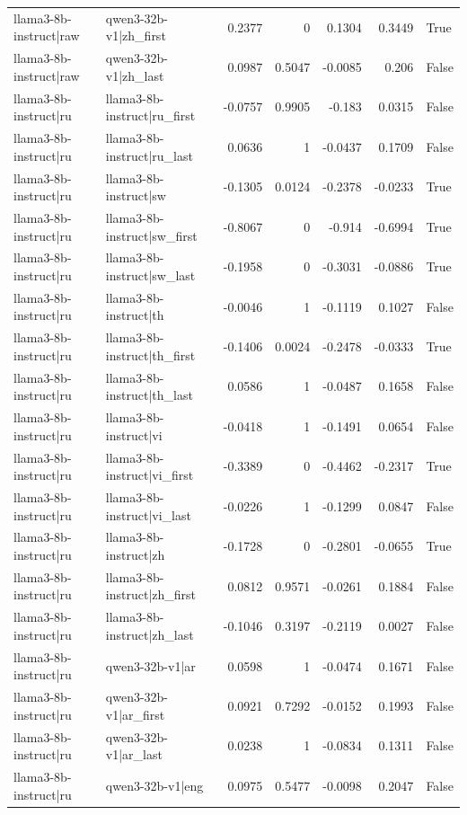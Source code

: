 \begin{table}
\begin{tabular}{l l r r r r l}
llama3-8b-instruct|raw & qwen3-32b-v1|zh_first & 0.2377 & 0 & 0.1304 & 0.3449 & True \\
llama3-8b-instruct|raw & qwen3-32b-v1|zh_last & 0.0987 & 0.5047 & -0.0085 & 0.206 & False \\
llama3-8b-instruct|ru & llama3-8b-instruct|ru_first & -0.0757 & 0.9905 & -0.183 & 0.0315 & False \\
llama3-8b-instruct|ru & llama3-8b-instruct|ru_last & 0.0636 & 1 & -0.0437 & 0.1709 & False \\
llama3-8b-instruct|ru & llama3-8b-instruct|sw & -0.1305 & 0.0124 & -0.2378 & -0.0233 & True \\
llama3-8b-instruct|ru & llama3-8b-instruct|sw_first & -0.8067 & 0 & -0.914 & -0.6994 & True \\
llama3-8b-instruct|ru & llama3-8b-instruct|sw_last & -0.1958 & 0 & -0.3031 & -0.0886 & True \\
llama3-8b-instruct|ru & llama3-8b-instruct|th & -0.0046 & 1 & -0.1119 & 0.1027 & False \\
llama3-8b-instruct|ru & llama3-8b-instruct|th_first & -0.1406 & 0.0024 & -0.2478 & -0.0333 & True \\
llama3-8b-instruct|ru & llama3-8b-instruct|th_last & 0.0586 & 1 & -0.0487 & 0.1658 & False \\
llama3-8b-instruct|ru & llama3-8b-instruct|vi & -0.0418 & 1 & -0.1491 & 0.0654 & False \\
llama3-8b-instruct|ru & llama3-8b-instruct|vi_first & -0.3389 & 0 & -0.4462 & -0.2317 & True \\
llama3-8b-instruct|ru & llama3-8b-instruct|vi_last & -0.0226 & 1 & -0.1299 & 0.0847 & False \\
llama3-8b-instruct|ru & llama3-8b-instruct|zh & -0.1728 & 0 & -0.2801 & -0.0655 & True \\
llama3-8b-instruct|ru & llama3-8b-instruct|zh_first & 0.0812 & 0.9571 & -0.0261 & 0.1884 & False \\
llama3-8b-instruct|ru & llama3-8b-instruct|zh_last & -0.1046 & 0.3197 & -0.2119 & 0.0027 & False \\
llama3-8b-instruct|ru & qwen3-32b-v1|ar & 0.0598 & 1 & -0.0474 & 0.1671 & False \\
llama3-8b-instruct|ru & qwen3-32b-v1|ar_first & 0.0921 & 0.7292 & -0.0152 & 0.1993 & False \\
llama3-8b-instruct|ru & qwen3-32b-v1|ar_last & 0.0238 & 1 & -0.0834 & 0.1311 & False \\
llama3-8b-instruct|ru & qwen3-32b-v1|eng & 0.0975 & 0.5477 & -0.0098 & 0.2047 & False \\

\end{tabular}
\end{table}
